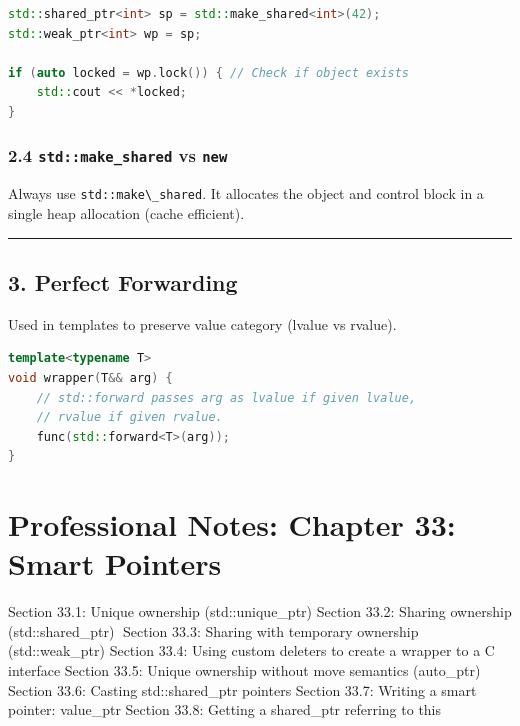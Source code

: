 \begin{lstlisting}[language={C++}]
std::shared_ptr<int> sp = std::make_shared<int>(42);
std::weak_ptr<int> wp = sp;

if (auto locked = wp.lock()) { // Check if object exists
    std::cout << *locked;
}
\end{lstlisting}

\hypertarget{stdmake_shared-vs-new}{%
\subsection{\texorpdfstring{2.4 \texttt{std::make\_shared} vs
\texttt{new}}{2.4 std::make\_shared vs new}}\label{stdmake_shared-vs-new}}

Always use \passthrough{\lstinline!std::make\_shared!}. It allocates the
object and control block in a single heap allocation (cache efficient).

\begin{center}\rule{0.5\linewidth}{0.5pt}\end{center}

\hypertarget{perfect-forwarding}{%
\section{3. Perfect Forwarding}\label{perfect-forwarding}}

Used in templates to preserve value category (lvalue vs rvalue).

\begin{lstlisting}[language={C++}]
template<typename T>
void wrapper(T&& arg) {
    // std::forward passes arg as lvalue if given lvalue,
    // rvalue if given rvalue.
    func(std::forward<T>(arg)); 
}
\end{lstlisting}

\hypertarget{professional-notes-chapter-33-smart-pointers}{%
\chapter{Professional Notes: Chapter 33: Smart
Pointers}\label{professional-notes-chapter-33-smart-pointers}}

Section 33.1: Unique ownership (std::unique\_ptr) Section 33.2: Sharing
ownership (std::shared\_ptr) Section 33.3: Sharing with temporary
ownership (std::weak\_ptr) Section 33.4: Using custom deleters to create
a wrapper to a C interface Section 33.5: Unique ownership without move
semantics (auto\_ptr) Section 33.6: Casting std::shared\_ptr pointers
Section 33.7: Writing a smart pointer: value\_ptr Section 33.8: Getting
a shared\_ptr referring to this

